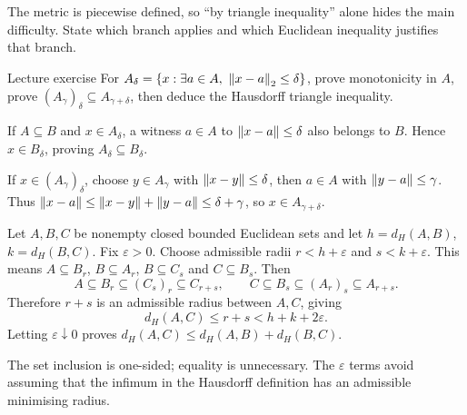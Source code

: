 \begin{tip}
The metric is piecewise defined, so ``by triangle inequality'' alone hides the main difficulty. State which branch applies and which Euclidean inequality justifies that branch.
\end{tip}
\begin{exam}{Lecture exercise}
For $A_\delta=\{x:\exists a\in A,\ \norm{x-a}_2\le\delta\}$, prove monotonicity in $A$, prove $(A_\gamma)_\delta\subseteq A_{\gamma+\delta}$, then deduce the Hausdorff triangle inequality.
\end{exam}
\begin{answer}
If $A\subseteq B$ and $x\in A_\delta$, a witness $a\in A$ to $\left\lVert x-a\right\rVert\le\delta$ also belongs to $B$. Hence $x\in B_\delta$, proving $A_\delta\subseteq B_\delta$.

If $x\in(A_\gamma)_\delta$, choose $y\in A_\gamma$ with $\left\lVert x-y\right\rVert\le\delta$, then $a\in A$ with $\left\lVert y-a\right\rVert\le\gamma$. Thus $\left\lVert x-a\right\rVert\le\left\lVert x-y\right\rVert+\left\lVert y-a\right\rVert\le\delta+\gamma$, so $x\in A_{\gamma+\delta}$.

Let $A,B,C$ be nonempty closed bounded Euclidean sets and let $h=d_H(A,B)$, $k=d_H(B,C)$. Fix $\varepsilon>0$. Choose admissible radii $r<h+\varepsilon$ and $s<k+\varepsilon$. This means $A\subseteq B_r$, $B\subseteq A_r$, $B\subseteq C_s$ and $C\subseteq B_s$. Then
\[A\subseteq B_r\subseteq(C_s)_r\subseteq C_{r+s},\qquad C\subseteq B_s\subseteq(A_r)_s\subseteq A_{r+s}.\]
Therefore $r+s$ is an admissible radius between $A,C$, giving
\[d_H(A,C)\le r+s<h+k+2\varepsilon.\]
Letting $\varepsilon\downarrow0$ proves $d_H(A,C)\le d_H(A,B)+d_H(B,C)$.
\end{answer}
\begin{tip}
The set inclusion is one-sided; equality is unnecessary. The $\varepsilon$ terms avoid assuming that the infimum in the Hausdorff definition has an admissible minimising radius.
\end{tip}

